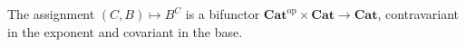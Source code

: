 The assignment $(C, B) \mapsto B^C$ is a bifunctor $\mathbf{Cat}^{\mathrm{op}} \times \mathbf{Cat} \to \mathbf{Cat}$, contravariant in the exponent and covariant in the base.
